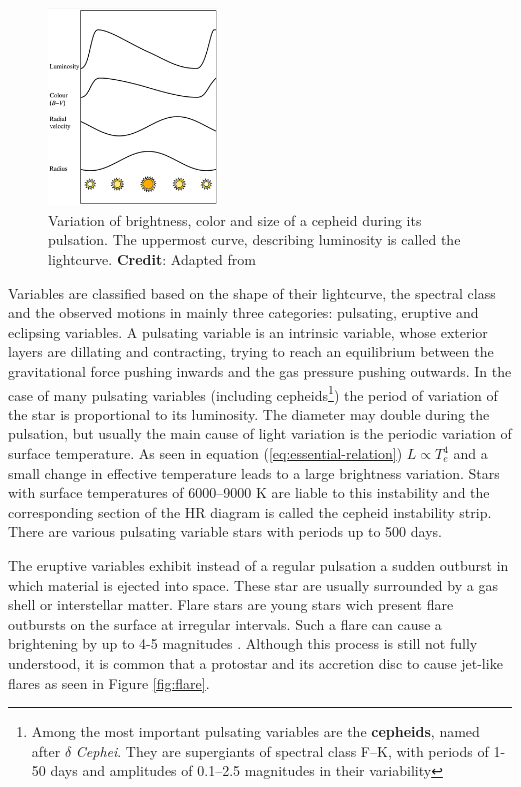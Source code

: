 \begin{figure}[hbt!]
		\centering
		\includegraphics[width=0.4\textwidth]{img/lightcurve-v2}%
  		\caption{Variation of brightness, color and size of a cepheid \protect\footnotemark[1] during its pulsation. The uppermost curve, describing luminosity is called the lightcurve. \textbf{Credit}: Adapted from \citep{Karttunen2017}}
  		\label{fig:lightcurve}
\end{figure}

Variables are classified based on the shape of their lightcurve, the spectral class and the observed motions in mainly three categories: pulsating, eruptive and eclipsing variables. A pulsating variable is an intrinsic variable, whose exterior layers are dillating and contracting, trying to reach an equilibrium between the gravitational force pushing inwards and the gas pressure pushing outwards. In the case of many pulsating variables (including cepheids\footnote{Among the most important pulsating variables are the \textbf{cepheids}, named after $\delta$ \textit{Cephei}. They are supergiants of spectral class F–K, with periods of 1-50 days and amplitudes of 0.1–2.5 magnitudes in their variability}) the period of variation of the star is proportional to its luminosity. The diameter may double during the pulsation, but usually the main cause of light variation is the periodic variation of surface temperature. As seen in equation (\ref{eq:essential-relation}) $L \propto T_e^4$ and a small change in effective temperature leads to a large brightness variation. Stars with surface temperatures of 6000–9000 K are liable to this instability and the corresponding section of the HR diagram is called the cepheid instability strip. There are various pulsating variable stars with periods up to 500 days. 

The eruptive variables exhibit instead of a regular pulsation a sudden outburst in which material is ejected into space. These star are usually surrounded by a gas shell or interstellar matter. Flare stars are young stars wich present flare outbursts on the surface at irregular intervals. Such a flare can cause a brightening by up to 4-5 magnitudes \citep{Karttunen2017}.  Although this process is still not fully understood, it is common that a protostar and its accretion disc to cause jet-like flares as seen in Figure \ref{fig:flare}.

